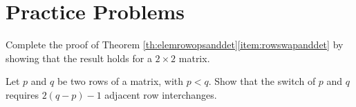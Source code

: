 \documentclass{ximera}
\begin{document}
\section*{Practice Problems}

\begin{problem}\label{prob:proofofrowswapanddet}
Complete the proof of Theorem \ref{th:elemrowopsanddet}\ref{item:rowswapanddet} by showing that the result holds for a $2\times 2$ matrix.
\end{problem}

\begin{problem}\label{prob:numberofrowswitches}
Let $p$ and $q$ be two rows of a matrix, with $p<q$.  Show that the switch of $p$ and $q$ requires $2(q-p)-1$ adjacent row interchanges.
\end{problem}
\end{document}
